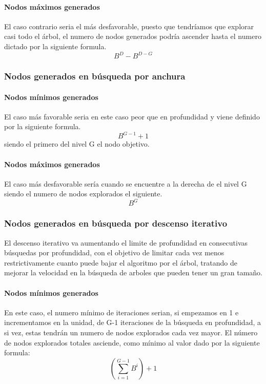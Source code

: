 \documentclass[a4paper,10pt]{article}
\begin{document}
\paragraph{Nodos máximos generados}
El caso contrario seria el más desfavorable, puesto que tendríamos que explorar casi todo el árbol, el numero de nodos generados podría ascender hasta el numero dictado por la siguiente formula.
\begin{equation}
  B^{D}-B^{D-G}
\end{equation}
\subsubsection{Nodos generados en búsqueda por anchura}
\paragraph{Nodos mínimos generados}
El caso más favorable seria en este caso peor que en profundidad y viene definido por la siguiente formula.
\begin{equation}
  B^{G-1}+1
\end{equation}
siendo el primero del nivel G el nodo objetivo.
\paragraph{Nodos máximos generados}
El caso más desfavorable sería cuando se encuentre a la derecha de el nivel G siendo el numero de nodos explorados el siguiente.
\begin{equation}
  B^{G}
\end{equation}
\subsubsection{Nodos generados en búsqueda por descenso iterativo}
El descenso iterativo va aumentando el limite de profundidad en consecutivas búsquedas por profundidad, con el objetivo de limitar cada vez menos restrictivamente cuanto puede bajar el algoritmo por el árbol, tratando de mejorar la velocidad en la búsqueda de arboles que pueden tener un gran tamaño.
\paragraph{Nodos mínimos generados}
En este caso, el numero mínimo de iteraciones serian, si empezamos en 1 e incrementamos en la unidad, de G-1 iteraciones de la búsqueda en profundidad, a si vez, estas tendrán un numero de nodos explorados cada vez mayor. El número de nodos explorados totales asciende, como mínimo al valor dado por la siguiente formula:
\begin{equation}
  (\sum^{G-1}_{i=1}{B^{i}})+1
\end{equation}
\end{document}
